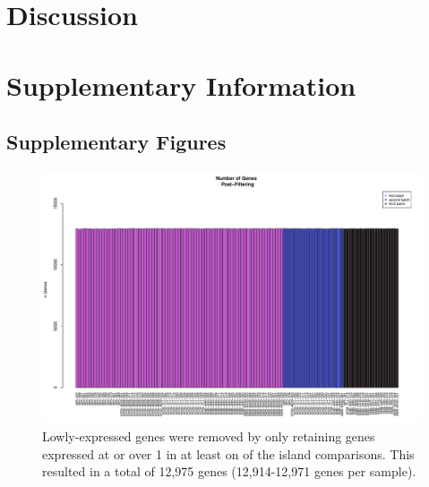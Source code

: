 \documentclass[12pt,a4paper,titlepage,twoside,openright]{book}
\begin{document}
\begin{mainmatter}
{{\chapter{Discussion}\label{}

\chapter{Supplementary Information}\label{}

\section{Supplementary Figures}

\begin{figure}[htb!]
\centering
\includegraphics[width=\textwidth,height=\textheight,keepaspectratio]{Figures/nGenes_indoRNA_postFiltering_123Combined.pdf}
\caption{Lowly-expressed genes were removed by only retaining genes expressed at or over 1 in at least on of the island comparisons. This resulted in a total of 12,975 genes (12,914-12,971 genes per sample).}
\label{fig:Total Genes Post Filtering}
\end{figure}


}}
\end{mainmatter}
\end{document}
